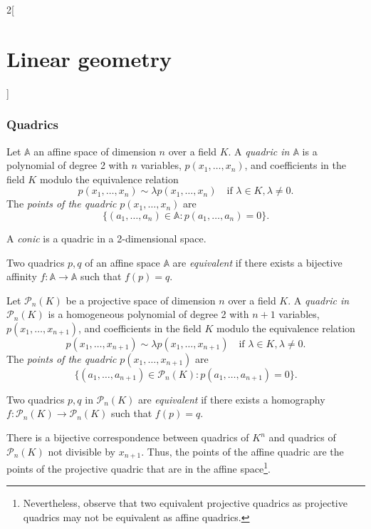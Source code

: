 \documentclass[../../../main.tex]{subfiles}
\begin{document}
\begin{multicols}{2}[\section{Linear geometry}]
  \subsubsection{Quadrics}
  \begin{definition}
    Let $\mathbb{A}$ an affine space of dimension $n$ over a field $K$. A \textit{quadric in $\mathbb{A}$} is a polynomial of degree 2 with $n$ variables, $p(x_1,\ldots,x_n)$, and coefficients in the field $K$ modulo the equivalence relation $$p(x_1,\ldots,x_n)\sim\lambda p(x_1,\ldots,x_n)\quad\text{if }\lambda\in K,\lambda\ne0.$$ The \textit{points of the quadric} $p(x_1,\ldots,x_n)$ are $$\{(a_1,\ldots,a_n)\in\mathbb{A}:p(a_1,\ldots,a_n)=0\}.$$
  \end{definition}
  \begin{definition}
    A \textit{conic} is a quadric in a 2-dimensional space.
  \end{definition}
  \begin{definition}
    Two quadrics $p,q$ of an affine space $\mathbb{A}$ are \textit{equivalent} if there exists a bijective affinity $f:\mathbb{A}\rightarrow\mathbb{A}$ such that $f(p)=q$.
  \end{definition}
  \begin{definition}
    Let $\mathcal{P}_n(K)$ be a projective space of dimension $n$ over a field $K$. A \textit{quadric in $\mathcal{P}_n(K)$} is a homogeneous polynomial of degree 2 with $n+1$ variables, $p(x_1,\ldots,x_{n+1})$, and coefficients in the field $K$ modulo the equivalence relation $$p(x_1,\ldots,x_{n+1})\sim\lambda p(x_1,\ldots,x_{n+1})\quad\text{if }\lambda\in K,\lambda\ne0.$$ The \textit{points of the quadric} $p(x_1,\ldots,x_{n+1})$ are $$\{(a_1,\ldots,a_{n+1})\in\mathcal{P}_n(K):p(a_1,\ldots,a_{n+1})=0\}.$$
  \end{definition}
  \begin{definition}
    Two quadrics $p,q$ in $\mathcal{P}_n(K)$ are \textit{equivalent} if there exists a homography $f:\mathcal{P}_n(K)\rightarrow\mathcal{P}_n(K)$ such that $f(p)=q$.
  \end{definition}
  \begin{theorem}
    There is a bijective correspondence between quadrics of $K^n$ and quadrics of $\mathcal{P}_n(K)$ not divisible by $x_{n+1}$. Thus, the points of the affine quadric are the points of the projective quadric that are in the affine space\footnote{Nevertheless, observe that two equivalent projective quadrics as projective quadrics may not be equivalent as affine quadrics.}.
  \end{theorem}

\end{multicols}
\end{document}

